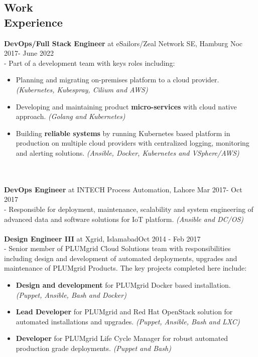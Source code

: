 \documentclass[margin]{res}
\begin{document}
\begin{resume}
\section{Work \\ Experience}
\textbf{DevOps/Full Stack Engineer} at eSailors/Zeal Network SE, Hamburg \hfill     Noc 2017- June 2022 \\
- Part of a development team with keys roles including:
    \begin{itemize}
      \item Planning and migrating on-premises platform to a cloud provider. \textit{(Kubernetes, Kubespray, Cilium and AWS)}
      \item Developing and maintaining product \textbf{micro-services} with cloud native approach. \textit{(Golang and Kubernetes)}
      \item Building \textbf{reliable systems} by running Kubernetes based platform in production on multiple cloud providers with centralized logging, monitoring and alerting solutions. \textit{(Ansible, Docker, Kubernetes and VSphere/AWS)}
    \end{itemize}    \\ \\
\textbf{DevOps Engineer} at INTECH Process Automation, Lahore \hfill     Mar 2017- Oct 2017 \\
- Responsible for deployment, maintenance, scalability and system engineering of advanced data and software solutions for IoT platform. \textit{(Ansible and DC/OS)}   \\ \\
{\bf Design Engineer III} at Xgrid, Islamabad\hfill     Oct 2014 - Feb 2017 \\
- Senior member of PLUMgrid Cloud Solutions team with responsibilities including design and development of automated deployments, upgrades and maintenance of PLUMgrid Products. The key projects completed here include:
    \begin{itemize}  \itemsep -2pt %
        \item \textbf{Design and development} for PLUMgrid Docker based installation. \textit{(Puppet, Ansible, Bash and Docker)}
        \item \textbf{Lead Developer} for PLUMgrid and Red Hat OpenStack solution for automated installations and upgrades. \textit{(Puppet, Ansible, Bash and LXC)}
        \item \textbf{Developer} for PLUMgrid Life Cycle Manager for robust automated production grade deployments. \textit{(Puppet and Bash)}
    \end{itemize}


\end{resume}
\end{document}
